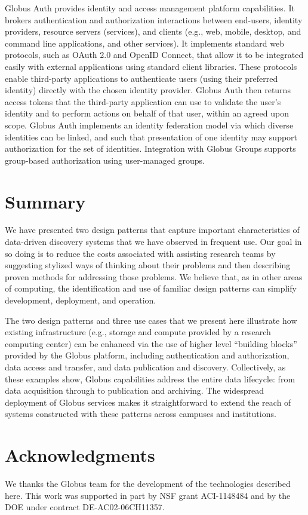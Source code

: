 \documentclass[10pt]{article}
\begin{document}
Globus Auth provides identity and access management platform capabilities. It brokers authentication and authorization interactions between end-users, identity providers, resource servers (services), and clients (e.g., web, mobile, desktop, and command line applications, and other services). 
It implements standard web protocols, such as OAuth 2.0 and OpenID Connect, that allow it to be integrated easily with external applications using standard client libraries. 
These protocols enable third-party applications to authenticate users (using their preferred identity) directly with the chosen identity provider. Globus Auth then returns access
tokens that the third-party application can use to validate the user's identity and to perform actions on behalf of that user, within an agreed upon scope. Globus Auth implements an identity federation model via which diverse identities can be linked, and such that presentation of one identity may support authorization for the set of identities. Integration with Globus Groups supports group-based authorization using user-managed groups.

\section*{Summary}

We have presented two design patterns that capture important characteristics of 
data-driven discovery systems that we have observed in frequent use. 
Our goal in so doing is to reduce the costs associated with assisting research teams
by suggesting stylized ways of thinking about their problems and then describing
proven methods for addressing those problems.
We believe that, as in other areas of computing, 
the identification and use of familiar design patterns 
can simplify development, deployment, and operation.

% 

The two design patterns and three use cases that we present here
illustrate how existing infrastructure (e.g., storage and compute provided by a research computing center) can be enhanced via the use of higher level ``building blocks'' provided by the Globus platform, including authentication and authorization, data access and transfer, and data publication and discovery. 
Collectively, as these examples show, Globus capabilities address the entire data lifecycle: from data acquisition through to publication and archiving. 
The widespread deployment of Globus services makes it straightforward to extend
the reach of systems constructed with these patterns across campuses and institutions.


\section*{Acknowledgments}

We thanks the Globus team for the development of the technologies described here.
This work was supported in part by NSF grant ACI-1148484 and by the DOE under contract DE-AC02-06CH11357.

\small


\end{document}
